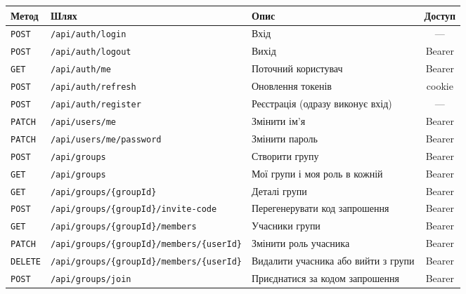 \begin{longtable}{@{}l L{6.4cm} L{5.4cm} c@{}}
\toprule
Метод & Шлях & Опис & Доступ\\
\midrule\endhead
\texttt{POST} & \texttt{/\allowbreak{}api/\allowbreak{}auth/\allowbreak{}login} & Вхід & —\\
\texttt{POST} & \texttt{/\allowbreak{}api/\allowbreak{}auth/\allowbreak{}logout} & Вихід & Bearer\\
\texttt{GET} & \texttt{/\allowbreak{}api/\allowbreak{}auth/\allowbreak{}me} & Поточний користувач & Bearer\\
\texttt{POST} & \texttt{/\allowbreak{}api/\allowbreak{}auth/\allowbreak{}refresh} & Оновлення токенів & cookie\\
\texttt{POST} & \texttt{/\allowbreak{}api/\allowbreak{}auth/\allowbreak{}register} & Реєстрація (одразу виконує вхід) & —\\
\texttt{PATCH} & \texttt{/\allowbreak{}api/\allowbreak{}users/\allowbreak{}me} & Змінити ім'я & Bearer\\
\texttt{PATCH} & \texttt{/\allowbreak{}api/\allowbreak{}users/\allowbreak{}me/\allowbreak{}password} & Змінити пароль & Bearer\\
\texttt{POST} & \texttt{/\allowbreak{}api/\allowbreak{}groups} & Створити групу & Bearer\\
\texttt{GET} & \texttt{/\allowbreak{}api/\allowbreak{}groups} & Мої групи і моя роль в кожній & Bearer\\
\texttt{GET} & \texttt{/\allowbreak{}api/\allowbreak{}groups/\allowbreak{}\{groupId\}} & Деталі групи & Bearer\\
\texttt{POST} & \texttt{/\allowbreak{}api/\allowbreak{}groups/\allowbreak{}\{groupId\}/\allowbreak{}invite-code} & Перегенерувати код запрошення & Bearer\\
\texttt{GET} & \texttt{/\allowbreak{}api/\allowbreak{}groups/\allowbreak{}\{groupId\}/\allowbreak{}members} & Учасники групи & Bearer\\
\texttt{PATCH} & \texttt{/\allowbreak{}api/\allowbreak{}groups/\allowbreak{}\{groupId\}/\allowbreak{}members/\allowbreak{}\{userId\}} & Змінити роль учасника & Bearer\\
\texttt{DELETE} & \texttt{/\allowbreak{}api/\allowbreak{}groups/\allowbreak{}\{groupId\}/\allowbreak{}members/\allowbreak{}\{userId\}} & Видалити учасника або вийти з групи & Bearer\\
\texttt{POST} & \texttt{/\allowbreak{}api/\allowbreak{}groups/\allowbreak{}join} & Приєднатися за кодом запрошення & Bearer\\

\end{longtable}
